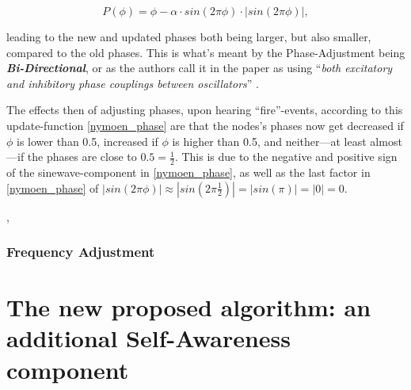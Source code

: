 			\begin{equation}\label{nymoen_phase}
			P(\phi) = \phi - \alpha \cdot sin(2\pi\phi) \cdot | sin(2\pi\phi) |	,
			\end{equation}
			
			leading to the new and updated phases both being larger, but also smaller, compared to the old phases. This is what's meant by the Phase-Adjustment being \textbf{\textit{Bi-Directional}}, or as the authors call it in the paper as using ``\textit{both excitatory and inhibitory phase couplings between oscillators}'' \cite{nymoen_synch}.
			
			The effects then of adjusting phases, upon hearing ``fire''-events, according to this update-function \eqref{nymoen_phase} are that the nodes's phases now get decreased if $\phi$ is lower than 0.5, increased if $\phi$ is higher than 0.5, and neither—at least almost—if the phases are close to $0.5 = \frac{1}{2}$. This is due to the negative and positive sign of the sinewave-component in \eqref{nymoen_phase}, as well as the last factor in \eqref{nymoen_phase} of $| sin(2\pi\phi) | \approx | sin(2\pi \frac{1}{2}) | = | sin(\pi) | = | 0 | = 0.$
			
			\sep
			
		
		
		
		
		\subsubsection{Frequency Adjustment}
		\label{subsubsec:freq_adj}









\section{The new proposed algorithm: an additional Self-Awareness component}
